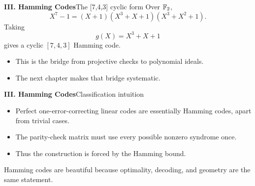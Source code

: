 \begin{frame}{\textbf{III. Hamming Codes}}{The [7,4,3] cyclic form}
\small
Over $\mathbb{F}_2$,
\[
  X^7-1=(X+1)(X^3+X+1)(X^3+X^2+1).
\]
Taking
\[
  g(X)=X^3+X+1
\]
gives a cyclic $[7,4,3]$ Hamming code.
\begin{itemize}
  \item This is the bridge from projective checks to polynomial ideals.
  \item The next chapter makes that bridge systematic.
\end{itemize}
\end{frame}

\begin{frame}{\textbf{III. Hamming Codes}}{Classification intuition}
\small
\begin{itemize}
  \item Perfect one-error-correcting linear codes are essentially Hamming codes, apart from trivial cases.
  \item The parity-check matrix must use every possible nonzero syndrome once.
  \item Thus the construction is forced by the Hamming bound.
\end{itemize}
Hamming codes are beautiful because optimality, decoding, and geometry are the same statement.
\end{frame}

